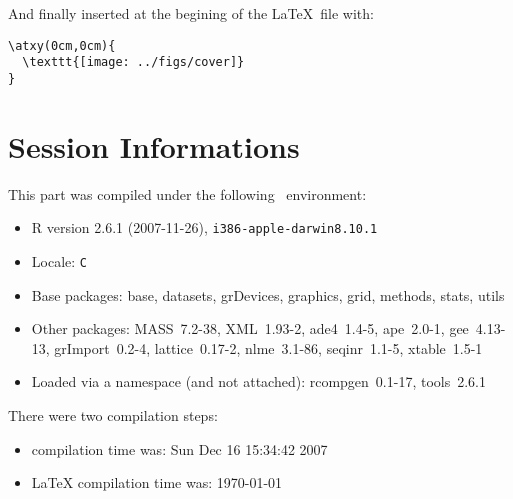 \documentclass[a4paper]{article}
\begin{document}
And finally inserted at the begining of the \LaTeX~file with:

\begin{verbatim}
\atxy(0cm,0cm){
  \texttt{[image: ../figs/cover]}
}
\end{verbatim}



\section*{Session Informations}

This part was compiled under the following \Rlogo{}~environment:

\begin{itemize}
  \item R version 2.6.1 (2007-11-26), \verb|i386-apple-darwin8.10.1|
  \item Locale: \verb|C|
  \item Base packages: base, datasets, grDevices, graphics, grid,
    methods, stats, utils
  \item Other packages: MASS~7.2-38, XML~1.93-2, ade4~1.4-5,
    ape~2.0-1, gee~4.13-13, grImport~0.2-4, lattice~0.17-2,
    nlme~3.1-86, seqinr~1.1-5, xtable~1.5-1
  \item Loaded via a namespace (and not attached): rcompgen~0.1-17,
    tools~2.6.1
\end{itemize}
There were two compilation steps:

\begin{itemize}
  \item \Rlogo{} compilation time was: Sun Dec 16 15:34:42 2007
  \item \LaTeX{} compilation time was: \today
\end{itemize}






\end{document}
